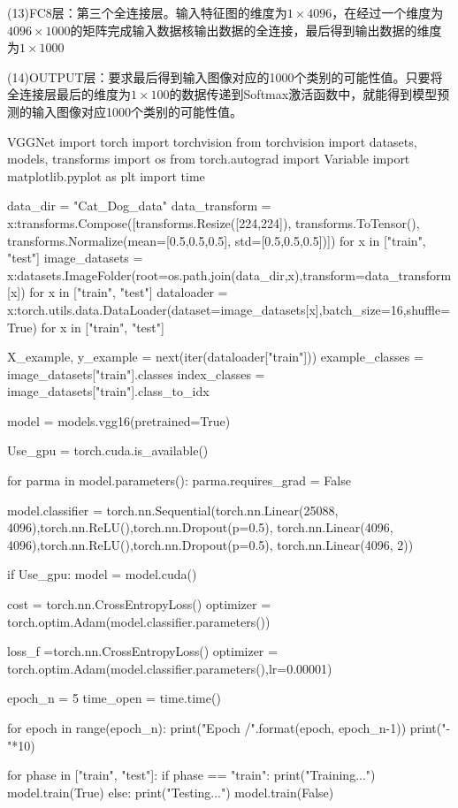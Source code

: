 \documentclass[openbib]{article}
\begin{document}
(13)FC8层：第三个全连接层。输入特征图的维度为$1\times4096$，在经过一个维度为$4096\times1000$的矩阵完成输入数据核输出数据的全连接，最后得到输出数据的维度为$1\times1000$

(14)OUTPUT层：要求最后得到输入图像对应的1000个类别的可能性值。只要将全连接层最后的维度为$1\times100$的数据传递到Softmax激活函数中，就能得到模型预测的输入图像对应1000个类别的可能性值。

\begin{Python}{VGGNet}
	import torch
	import torchvision
	from torchvision import datasets, models, transforms
	import os
	from torch.autograd import Variable
	import matplotlib.pyplot as plt
	import time
	
	data_dir = "Cat_Dog_data"
	data_transform = {x:transforms.Compose([transforms.Resize([224,224]),
		transforms.ToTensor(),
		transforms.Normalize(mean=[0.5,0.5,0.5], std=[0.5,0.5,0.5])])
		for x in ["train", "test"]}
	image_datasets = {x:datasets.ImageFolder(root=os.path.join(data_dir,x),transform=data_transform[x])
		for x in ["train", "test"]}
	dataloader = {x:torch.utils.data.DataLoader(dataset=image_datasets[x],batch_size=16,shuffle=True)
		for x in ["train", "test"]}
	
	X_example, y_example = next(iter(dataloader["train"]))
	example_classes = image_datasets["train"].classes
	index_classes = image_datasets["train"].class_to_idx
	
	model = models.vgg16(pretrained=True)
	
	Use_gpu = torch.cuda.is_available()
	
	for parma in model.parameters():
	parma.requires_grad = False
	
	model.classifier = torch.nn.Sequential(torch.nn.Linear(25088, 4096),torch.nn.ReLU(),torch.nn.Dropout(p=0.5),
	torch.nn.Linear(4096, 4096),torch.nn.ReLU(),torch.nn.Dropout(p=0.5),
	torch.nn.Linear(4096, 2))
	
	if Use_gpu:
	model = model.cuda()
	
	cost = torch.nn.CrossEntropyLoss()
	optimizer = torch.optim.Adam(model.classifier.parameters())
	
	loss_f =torch.nn.CrossEntropyLoss()
	optimizer = torch.optim.Adam(model.classifier.parameters(),lr=0.00001)
	
	epoch_n = 5
	time_open = time.time()
	
	for epoch in range(epoch_n):
	print("Epoch {}/{}".format(epoch, epoch_n-1))
	print("-"*10)
	
	for phase in ["train", "test"]:
	if phase == "train":
	print("Training...")
	model.train(True)
	else:
	print("Testing...")
	model.train(False)
	

\end{Python}
\end{document}
